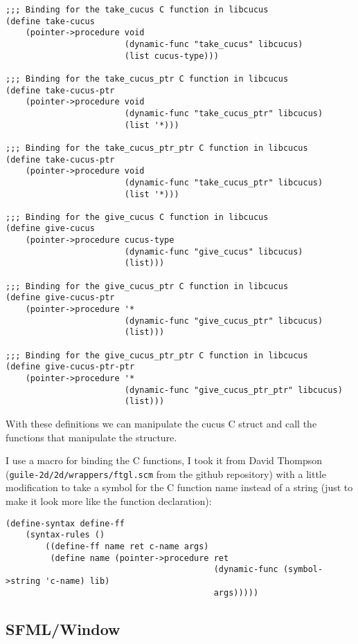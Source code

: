 \documentclass[latterpaper, leqno]{article}
\begin{document}
\begin{verbatim}
;;; Binding for the take_cucus C function in libcucus
(define take-cucus
    (pointer->procedure void
                        (dynamic-func "take_cucus" libcucus)
                        (list cucus-type)))

;;; Binding for the take_cucus_ptr C function in libcucus
(define take-cucus-ptr
    (pointer->procedure void
                        (dynamic-func "take_cucus_ptr" libcucus)
                        (list '*)))

;;; Binding for the take_cucus_ptr_ptr C function in libcucus
(define take-cucus-ptr
    (pointer->procedure void
                        (dynamic-func "take_cucus_ptr" libcucus)
                        (list '*)))

;;; Binding for the give_cucus C function in libcucus
(define give-cucus
    (pointer->procedure cucus-type
                        (dynamic-func "give_cucus" libcucus)
                        (list)))

;;; Binding for the give_cucus_ptr C function in libcucus
(define give-cucus-ptr
    (pointer->procedure '*
                        (dynamic-func "give_cucus_ptr" libcucus)
                        (list)))

;;; Binding for the give_cucus_ptr_ptr C function in libcucus
(define give-cucus-ptr-ptr
    (pointer->procedure '*
                        (dynamic-func "give_cucus_ptr_ptr" libcucus)
                        (list)))
\end{verbatim}

With these definitions we can manipulate the cucus C struct and call the functions that manipulate the structure.

I use a macro for binding the C functions, I took it from David Thompson (\texttt{guile-2d/2d/wrappers/ftgl.scm} from the github repository) with a little modification to take a symbol for the C function name instead of a string (just to make it look more like the function declaration):

\begin{verbatim}
(define-syntax define-ff
    (syntax-rules ()
        ((define-ff name ret c-name args)
         (define name (pointer->procedure ret
                                          (dynamic-func (symbol->string 'c-name) lib)
                                          args)))))
\end{verbatim}

\subsection{SFML/Window}
\end{document}
